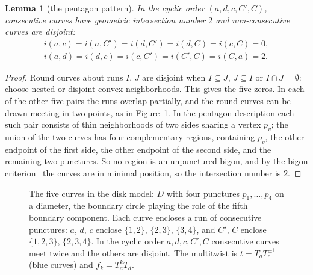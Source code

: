 \documentclass[11pt]{article}
\newtheorem{lemma}[theorem]{Lemma}
\theoremstyle{remark}
\begin{document}
\begin{lemma}[the pentagon pattern]\label{lem:pentagon}
In the cyclic order $(a,d,c,C',C)$, consecutive curves have geometric
intersection number $2$ and non-consecutive curves are disjoint:
\begin{gather*}
i(a,c)=i(a,C')=i(d,C')=i(d,C)=i(c,C)=0,\\
i(a,d)=i(d,c)=i(c,C')=i(C',C)=i(C,a)=2.
\end{gather*}
\end{lemma}

\begin{proof}
Round curves about runs $I$, $J$ are disjoint when $I\subseteq J$,
$J\subseteq I$ or $I\cap J=\emptyset$: choose nested or disjoint convex
neighborhoods. This gives the five zeros. In each of the other five pairs
the runs overlap partially, and the round curves can be drawn meeting in
two points, as in Figure~\ref{fig:curves}. In the pentagon description
each such pair consists of thin neighborhoods of two sides sharing a vertex
$p_v$; the union of the two curves has four complementary regions,
containing $p_v$, the other endpoint of the first side, the other endpoint
of the second side, and the remaining two punctures. So no region is an
unpunctured bigon, and by the bigon
criterion~\cite[Prop.~1.7]{FM} the curves are in minimal position, so the
intersection number is $2$.
\end{proof}

\begin{figure}[ht]
\centering
{}
\caption{The five curves in the disk model: $D$ with four punctures
$p_1,\dots,p_4$ on a diameter, the boundary circle playing the role of the
fifth boundary component. Each curve encloses a run of consecutive
punctures: $a$, $d$, $c$ enclose $\{1,2\}$, $\{2,3\}$, $\{3,4\}$, and $C'$,
$C$ enclose $\{1,2,3\}$, $\{2,3,4\}$. In the cyclic order
$a,d,c,C',C$ consecutive curves meet twice and the others are disjoint.
The multitwist is $t=T_aT_c^{\pm1}$ (blue curves) and $f_k=T_a^kT_d$.}
\label{fig:curves}
\end{figure}
\end{document}
